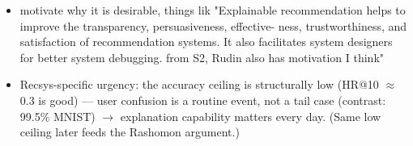 \begin{itemize}
    \item motivate why it is desirable, things lik "Explainable recommendation
helps to improve the transparency, persuasiveness, effective-
ness, trustworthiness, and satisfaction of recommendation
systems. It also facilitates system designers for better system
debugging. from S2, Rudin also has motivation I think" 
    \item Recsys-specific urgency: the accuracy ceiling is structurally low (HR@10 $\approx$ 0.3 is good) — user confusion is a routine event, not a tail case (contrast: 99.5\% MNIST) $\to$ explanation capability matters every day. (Same low ceiling later feeds the Rashomon argument.) 

\end{itemize}
